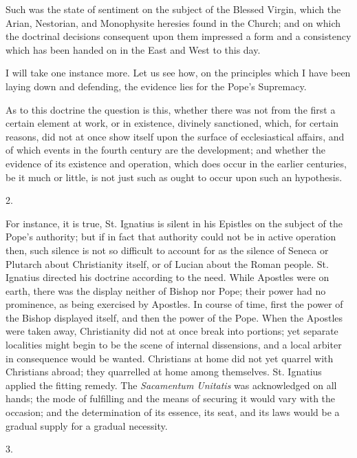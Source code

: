 Such was the state of sentiment on the subject of the
Blessed Virgin, which the Arian, Nestorian, and
Monophysite heresies found in the Church; and on which
the doctrinal decisions consequent upon them impressed a
form and a consistency which has been handed on in the
East and West to this day.


I will take one instance more. Let us see how, on the
principles which I have been laying down and defending,
the evidence lies for the Pope's Supremacy.

As to this doctrine the question is this, whether
there was not from the first a certain element at work,
or in existence, divinely sanctioned, which, for certain
reasons, did not at once show itself upon the surface of
ecclesiastical affairs, and of which events in the fourth
century are the development; and whether the evidence of
its existence and operation, which does occur in the
earlier centuries, be it much or little, is not just such
as ought to occur upon such an hypothesis.

2.

For instance, it is true, St. Ignatius is silent in
his Epistles on the subject of the Pope's authority; but
if in fact that authority could not be in active
operation then, such silence is not so difficult to
account for as the silence of Seneca or Plutarch about
Christianity itself, or of Lucian about the Roman people.
St. Ignatius directed his doctrine according to the need.
While Apostles were on earth, there was the display
neither of Bishop nor Pope; their power had no
prominence, as being exercised by Apostles. In course of
time, first the power of the Bishop displayed itself, and
then the power of the Pope. When the Apostles were taken
away, Christianity did not at once break into portions;
yet separate localities might begin to be the scene of
internal dissensions, and a local arbiter in consequence
would be wanted. Christians at home did not yet quarrel
with Christians abroad; they quarrelled at home among
themselves. St. Ignatius applied the fitting remedy. The \emph{Sacamentum
Unitatis} was acknowledged on all hands; the mode of
fulfilling and the means of securing it would vary with
the occasion; and the determination of its essence, its
seat, and its laws would be a gradual supply for a
gradual necessity.

3.

